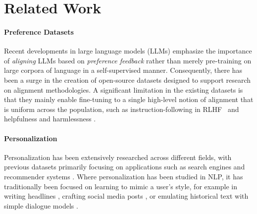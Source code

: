 \section{Related Work}


\paragraph{Preference Datasets}
Recent developments in large language models (LLMs) emphasize the importance of \emph{aligning} LLMs based on \emph{preference feedback} rather than merely pre-training on large corpora of language in a self-supervised manner. 
Consequently, there has been a surge in the creation of open-source datasets \citep{bai2022training, nakano2022webgpt, kopf2023openassistant, dubois2024alpacafarm, lambert2024rewardbench} designed to support research on alignment methodologies. A significant limitation in the existing datasets is that they mainly enable fine-tuning to a single high-level notion of alignment that is uniform across the population, such as instruction-following in RLHF~\citep{ouyang2022training} and helpfulness and harmlessness \citep{bai2022training}. 

\paragraph{Personalization}

Personalization has been extensively researched across different fields, with previous datasets primarily focusing on applications such as search engines and recommender systems \citep{davidson2010youtube, das2007google, Xu_2022, F_rber_2020}. 
Where personalization has been studied in NLP, it has traditionally been focused on learning to mimic a user's style, for example in writing headlines \citep{ao-etal-2021-pens}, crafting social media posts \citep{mazare-etal-2018-training}, or emulating historical text with simple dialogue models \citep{wu-etal-2021-personalized}.

